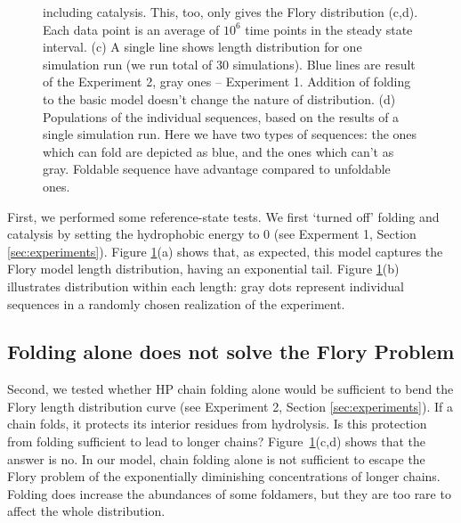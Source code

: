 \documentclass[5p,times]{elsarticle}
\begin{document}
\begin{figure}[h!]
{{{including catalysis.  This, too, only gives the Flory distribution (c,d).}  Each data point is an 
average of $10^6$ time points in the steady state interval. (c) 
A single line shows length distribution for one simulation run (we run total of 30 simulations). 
Blue lines are result of the Experiment 2, gray ones -- Experiment 1. Addition of folding to the 
basic model doesn't change the nature of distribution. (d) Populations of the individual 
sequences, 
based on the results of a single simulation run. Here we have two types of sequences: the ones 
which can fold are depicted as blue, and the ones which can't as gray. Foldable sequence have 
advantage compared 
to unfoldable ones.}}
  \label{fig:sim.flory-fold}
\end{figure}
 First, we performed some reference-state tests.  We first `turned off' folding and catalysis by 
setting the hydrophobic energy to $0$ (see Experment 1, Section \ref{sec:experiments}).  Figure 
\ref{fig:sim.flory-fold}(a) 
shows that, as expected, this model captures the Flory model length distribution, having an 
exponential tail.  Figure \ref{fig:sim.flory-fold}(b) illustrates distribution within each length: 
gray dots represent individual sequences in a randomly chosen realization of the experiment. 


\subsection{Folding alone does not solve the Flory Problem}
 Second, we tested whether HP chain folding alone would be sufficient to bend the Flory length 
distribution curve (see Experiment 2, Section \ref{sec:experiments}).  If a chain folds, it 
protects its interior 
residues from 
hydrolysis.  Is this protection from folding sufficient to lead to longer chains?  
Figure~\ref{fig:sim.flory-fold}(c,d) shows that the answer is no.  In our model, chain folding 
alone is 
not sufficient to escape the Flory problem of the exponentially diminishing concentrations of longer 
chains.  Folding does increase the abundances of some foldamers, but they are too rare to affect the 
whole distribution.
\end{document}
